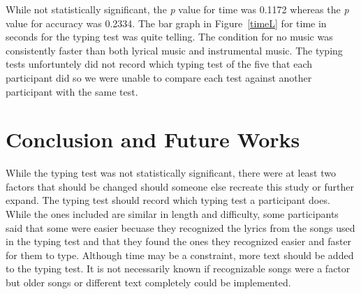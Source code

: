 \documentclass[manuscript, screen, review]{acmart} %
\begin{document}
While not statistically significant, the \textit{p} value for time was 0.1172 whereas the \textit{p} value for accuracy was 0.2334.
The bar graph in Figure~\ref{timeL} for time in seconds for the typing test was quite telling. The condition for no music was consistently faster than both
lyrical music and instrumental music. The typing tests unfortuntely did not record which typing test of the five that each participant did so we
were unable to compare each test against another participant with the same test.

\section{Conclusion and Future Works}
While the typing test was not statistically significant, there were at least two factors that should be changed should someone else recreate this study or 
further expand. The typing test should record which typing test a participant does. While the ones included are similar in length and difficulty, some 
participants said that some were easier becuase they recognized the lyrics from the songs used in the typing test and that they found the ones they 
recognized easier and faster for them to type. Although time may be a constraint, more text should be added to the typing test. It is not necessarily 
known if recognizable songs were a factor but older songs or different text completely could be implemented.



\end{document}
